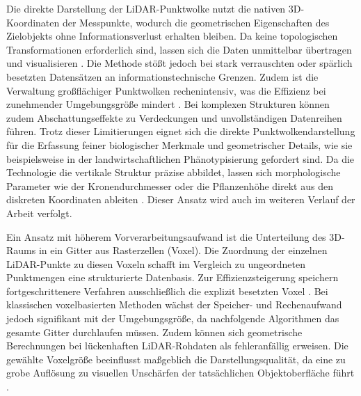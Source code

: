 Die direkte Darstellung der LiDAR-Punktwolke nutzt die nativen 3D-Koordinaten der Messpunkte, wodurch die geometrischen Eigenschaften des Zielobjekts ohne Informationsverlust erhalten bleiben. Da keine topologischen Transformationen erforderlich sind, lassen sich die Daten unmittelbar übertragen und visualisieren \cite{wangAutomatedPhenotypicTrait2024}. Die Methode stößt jedoch bei stark verrauschten oder spärlich besetzten Datensätzen an informationstechnische Grenzen. Zudem ist die Verwaltung großflächiger Punktwolken rechenintensiv, was die Effizienz bei zunehmender Umgebungsgröße mindert \cite{chengRealTimeLiDARInertial2024}. Bei komplexen Strukturen können zudem Abschattungseffekte zu Verdeckungen und unvollständigen Datenreihen führen. Trotz dieser Limitierungen eignet sich die direkte Punktwolkendarstellung für die Erfassung feiner biologischer Merkmale und geometrischer Details, wie sie beispielsweise in der landwirtschaftlichen Phänotypisierung gefordert sind. Da die Technologie die vertikale Struktur präzise abbildet, lassen sich morphologische Parameter wie der Kronendurchmesser oder die Pflanzenhöhe direkt aus den diskreten Koordinaten ableiten \cite{wangAutomatedPhenotypicTrait2024}. Dieser Ansatz wird auch im weiteren Verlauf der Arbeit verfolgt.

Ein Ansatz mit höherem Vorverarbeitungsaufwand ist die Unterteilung des 3D-Raums in ein Gitter aus Rasterzellen (Voxel). Die Zuordnung der einzelnen LiDAR-Punkte zu diesen Voxeln schafft im Vergleich zu ungeordneten Punktmengen eine strukturierte Datenbasis. Zur Effizienzsteigerung speichern fortgeschrittenere Verfahren ausschließlich die explizit besetzten Voxel \cite{chengRealTimeLiDARInertial2024}. Bei klassischen voxelbasierten Methoden wächst der Speicher- und Rechenaufwand jedoch signifikant mit der Umgebungsgröße, da nachfolgende Algorithmen das gesamte Gitter durchlaufen müssen. Zudem können sich geometrische Berechnungen bei lückenhaften LiDAR-Rohdaten als fehleranfällig erweisen. Die gewählte Voxelgröße beeinflusst maßgeblich die Darstellungsqualität, da eine zu grobe Auflösung zu visuellen Unschärfen der tatsächlichen Objektoberfläche führt \cite{chengRealTimeLiDARInertial2024}.

